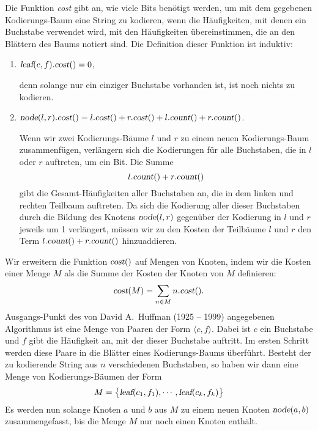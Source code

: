 Die Funktion \textsl{cost} gibt an, wie viele Bits ben\"otigt werden, um mit dem gegebenen
Kodierungs-Baum eine String zu kodieren, wenn die H\"aufigkeiten, mit denen ein Buchstabe
verwendet wird, mit den H\"aufigkeiten \"ubereinstimmen, die an den Bl\"attern des Baums notiert
sind.  Die Definition dieser Funktion ist induktiv:
\begin{enumerate}
\item $\textsl{leaf}(c,f).\textsl{cost}() = 0$,

      denn solange nur ein einziger Buchstabe vorhanden ist, ist noch nichts zu kodieren.
\item $\textsl{node}(l,r).\textsl{cost}() = 
       l.\textsl{cost}() + r.\textsl{cost}() + l.\textsl{count}() + r.\textsl{count}()$.

      Wenn wir zwei Kodierungs-B\"aume $l$ und $r$ zu einem neuen Kodierungs-Baum
      zusammenf\"ugen, verl\"angern sich die Kodierungen f\"ur alle Buchstaben, die in $l$ oder
      $r$ auftreten, um ein Bit.
      Die Summe 
      \[ l.\textsl{count}() + r.\textsl{count}() \]
      gibt die Gesamt-H\"aufigkeiten aller Buchstaben an, die in dem linken und
      rechten Teilbaum auftreten.  Da sich die Kodierung aller dieser Buchstaben
      durch die Bildung des Knotens $\textsl{node}(l,r)$ gegen\"uber der Kodierung in $l$
      und $r$ jeweils um 1 verl\"angert, m\"ussen wir zu den Kosten der Teilb\"aume $l$ und $r$
      den Term $l.\textsl{count}() + r.\textsl{count}()$ hinzuaddieren.
\end{enumerate}
Wir erweitern die Funktion $\textsl{cost}()$ auf Mengen von Knoten, indem wir die Kosten
einer Menge $M$ als die Summe der Kosten der Knoten von $M$ definieren:
\[ \textsl{cost}(M) = \sum\limits_{n\in M} n.\textsl{cost}(). \]
Ausgangs-Punkt des von David A.~Huffman (1925 -- 1999) \cite{huffman:52} angegebenen
Algorithmus ist eine Menge von Paaren der Form $\langle c, f\rangle$.  Dabei ist $c$ ein
Buchstabe und $f$ gibt die H\"aufigkeit an, mit der dieser Buchstabe auftritt.  Im ersten
Schritt werden diese Paare in die Bl\"atter eines Kodierungs-Baums \"uberf\"uhrt.  Besteht der
zu kodierende String aus  $n$ verschiedenen Buchstaben, so haben
wir dann eine Menge von Kodierungs-B\"aumen der Form
\begin{equation}
  \label{eq:huffmann1}
 M = \bigl\{ \textsl{leaf}(c_1,f_1), \cdots, \textsl{leaf}(c_k,f_k) \bigr\}   
\end{equation}
Es werden nun solange Knoten $a$ und $b$ aus $M$ zu einem neuen Knoten
$\textsl{node}(a,b)$ zusammengefasst, bis die Menge $M$ nur noch einen Knoten enth\"alt.
